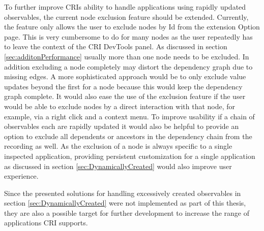 To further improve CRIs ability to handle applications using rapidly updated observables, the current node exclusion feature should be extended. Currently, the feature only allows the user to exclude nodes by Id from the extension Option page. This is very cumbersome to do for many nodes as the user repeatedly has to leave the context of the CRI DevTools panel. As discussed in section \ref{sec:additonPerformance} usually more than one node needs to be excluded. In addition excluding a node completely may distort the dependency graph due to missing edges. A more sophisticated approach would be to only exclude value updates beyond the first for a node because this would keep the dependency graph complete. It would also ease the use of the exclusion feature if the user would be able to exclude nodes by a direct interaction with that node, for example, via a right click and a context menu. To improve usability if a chain of observables each are rapidly updated it would also be helpful to provide an option to exclude all dependents or ancestors in the dependency chain from the recording as well.
As the exclusion of a node is always specific to a single inspected application, providing persistent customization for a single application as discussed in section \ref{sec:DynamicallyCreated} would also improve user experience.

Since the presented solutions for handling excessively created observables in section \ref{sec:DynamicallyCreated} were not implemented as part of this thesis, they are also a possible target for further development to increase the range of applications CRI supports.
 	
